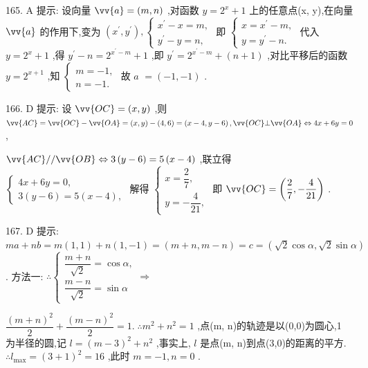165. A 提示: 设向量 $\vv{a} = \left( {m,n}\right)$ ,对函数 $y = {2}^{x} + 1$ 上的任意点(x, y),在向量 $\vv{a}$ 的作用下,变为 $\left( {{x}^{\prime },{y}^{\prime }}\right) ,\left\{  \begin{array}{l} {x}^{\prime } - x = m, \\  {y}^{\prime } - y = n, \end{array}\right.$ 即 $\left\{  \begin{array}{l} x = {x}^{\prime } - m, \\  y = {y}^{\prime } - n. \end{array}\right.$ 代入 $y = {2}^{x} + 1$ ,得 ${y}^{\prime } - n = {2}^{{x}^{\prime } - m} + 1$ ,即 ${y}^{\prime } = {2}^{{x}^{\prime } - m} + \left( {n + 1}\right)$ ,对比平移后的函数 $y = {2}^{x + 1}$ ,知 $\left\{  \begin{array}{l} m =  - 1, \\  n =  - 1. \end{array}\right.$ 故 $a$  $= \left( {-1, - 1}\right)$ .

166. D 提示: 设 $\vv{OC} = \left( {x,y}\right)$ ,则 $\vv{AC} = \vv{OC} - \vv{OA} = \left( {x,y}\right)  - \left( {4,6}\right)  = \left( {x - 4,y - 6}\right) ,\vv{OC}\bot \vv{OA} \Leftrightarrow  {4x} + {6y} = 0$ ,

$\vv{AC}//\vv{OB} \Leftrightarrow  3\left( {y - 6}\right)  = 5\left( {x - 4}\right)$ ,联立得 $\left\{  \begin{array}{l} {4x} + {6y} = 0, \\  3\left( {y - 6}\right)  = 5\left( {x - 4}\right) , \end{array}\right.$ 解得 $\left\{  \begin{array}{l} x = \dfrac{2}{7}, \\  y =  - \dfrac{4}{21}, \end{array}\right.$ 即 $\vv{OC} = \left( {\dfrac{2}{7}, - \dfrac{4}{21}}\right)$ .

167. D 提示: ${ma} + {nb} = m\left( {1,1}\right)  + n\left( {1, - 1}\right)  = \left( {m + n,m - n}\right)  = c = \left( {\sqrt{2}\cos \alpha ,\sqrt{2}\sin \alpha }\right)$ . 方法一: $\therefore \left\{  {\begin{array}{l} \dfrac{m + n}{\sqrt{2}} = \cos \alpha , \\  \dfrac{m - n}{\sqrt{2}} = \sin \alpha  \end{array} \Rightarrow  }\right.$

$\dfrac{{\left( m + n\right) }^{2}}{2} + \dfrac{{\left( m - n\right) }^{2}}{2} = 1.\;\therefore {m}^{2} + {n}^{2} = 1$ ,点(m, n)的轨迹是以(0,0)为圆心,1 为半径的圆,记 $l = {\left( m - 3\right) }^{2} + {n}^{2}$ ,事实上, $l$ 是点(m, n)到点(3,0)的距离的平方. $\therefore {l}_{\max } = {\left( 3 + 1\right) }^{2} = {16}$ ,此时 $m =  - 1,n = 0$ .

